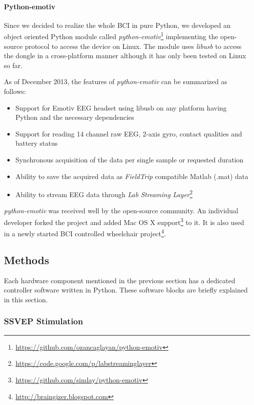 \documentclass[12pt]{article}
\newcommand\mysubsection[1]{\subsection{#1}}
\newcommand\mysubsubsection[1]{\subsubsection{#1}}
\newcommand\mysubsubsubsection[1]{\paragraph{#1}\hspace{0pt}}
\numberwithin{equation}{section}
\numberwithin{figure}{section}
\numberwithin{table}{section}
\begin{document}
\mysubsubsubsection{Python-emotiv}
\par{
    Since we decided to realize the whole BCI in pure Python, we developed an object oriented
    Python module called \emph{python-emotiv}\footnote{\url{https://github.com/ozancaglayan/python-emotiv}}
    implementing the open-source protocol to access the device on Linux. The module uses \emph{libusb}
    to access the dongle in a cross-platform manner although it has only been tested on Linux
    so far.
}
\par{
    As of December 2013, the features of \emph{python-emotiv} can be summarized as follows:
    \begin{itemize}
        \item Support for Emotiv EEG headset using libusb on any platform having Python and the necessary dependencies
        \item Support for reading 14 channel raw EEG, 2-axis gyro, contact qualities and battery status
        \item Synchronous acquisition of the data per single sample or requested duration
        \item Ability to save the acquired data as \emph{FieldTrip} \citep{oostenveld_fieldtrip:_2011} compatible Matlab (.mat) data
        \item Ability to stream EEG data through \emph{Lab Streaming Layer}\footnote{\url{https://code.google.com/p/labstreaminglayer}}
    \end{itemize}
}
\par{
    \emph{python-emotiv} was received well by the open-source community. An individual developer
    forked the project and added Mac OS X support\footnote{\url{https://github.com/simlay/python-emotiv}} to it.
    It is also used in a newly started BCI controlled wheelchair project\footnote{\url{http://braingizer.blogspot.com}}.
}

\mysubsection{Methods}
\par{
    Each hardware component mentioned in the previous section has a dedicated
    controller software written in Python. These software blocks are briefly
    explained in this section.
}

\mysubsubsection{SSVEP Stimulation}
\end{document}
